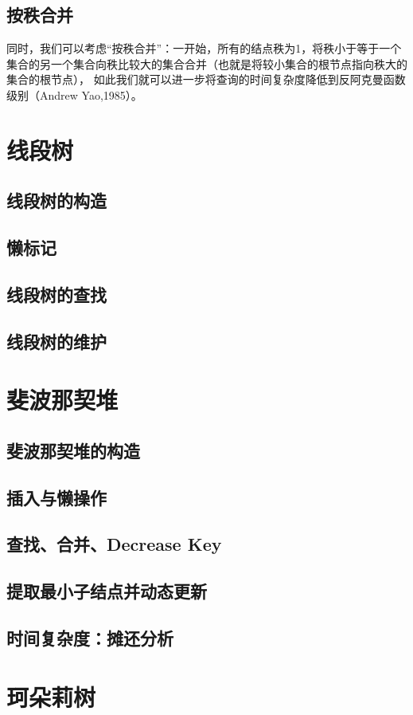 \documentclass[12pt,a4paper,UTF16]{ctexbook}
\theoremstyle{plain}
\begin{document}
\subsection{按秩合并}
同时，我们可以考虑“按秩合并”：一开始，所有的结点秩为1，将秩小于等于一个集合的另一个集合向秩比较大的集合合并（也就是将较小集合的根节点指向秩大的集合的根节点），
如此我们就可以进一步将查询的时间复杂度降低到反阿克曼函数级别（Andrew Yao,1985）。
\section{线段树}
\subsection{线段树的构造}
\subsection{懒标记}
\subsection{线段树的查找}
\subsection{线段树的维护}
\section{斐波那契堆}
\subsection{斐波那契堆的构造}
\subsection{插入与懒操作}
\subsection{查找、合并、Decrease Key}
\subsection{提取最小子结点并动态更新}
\subsection{时间复杂度：摊还分析}
\section{珂朵莉树}
\end{document}
